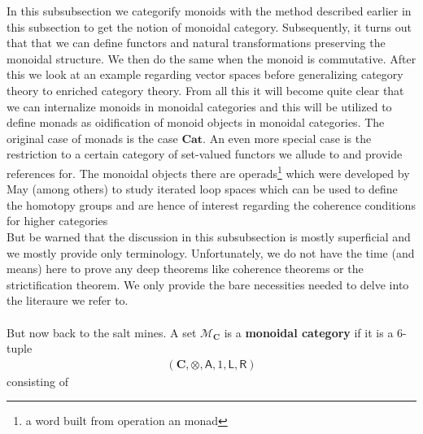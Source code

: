 \nocite{bc53e62a}
In this subsubsection we categorify monoids with the method described earlier in this subsection to get the notion of monoidal category. Subsequently, it turns out that that we can define functors and natural transformations preserving the monoidal structure. We then do the same when the monoid is commutative. After this we look at an example regarding vector spaces before generalizing category theory to enriched category theory. From all this it will become quite clear that we can internalize monoids in monoidal categories and this will be utilized to define monads as oidification of monoid objects in monoidal categories. The original case of monads is the case $\mathbf{Cat}$. An even more special case is the restriction to a certain category of set-valued functors we allude to and provide references for. The monoidal objects there are operads\footnote{a word built from operation an monad} which were developed by May (among others) to study iterated loop spaces which can be used to define the homotopy groups and are hence of interest regarding the coherence conditions for higher categories
\\
But be warned that the discussion in this subsubsection is mostly superficial and we mostly provide only terminology. Unfortunately, we do not have the time (and means) here to prove any deep theorems like coherence theorems or the strictification theorem. We only provide the bare necessities needed to delve into the literaure we refer to.
\\\\
But now back to the salt mines. A set $\mathcal{M}_{\mathbf{C}}$ is a \textbf{monoidal category} if it is a $6$-tuple
\begin{align*}
  \left(
    \mathbf{C},
    \otimes,
    \mathsf{A},
    1,
    \mathsf{L},
    \mathsf{R}
  \right)
\end{align*}
consisting of
